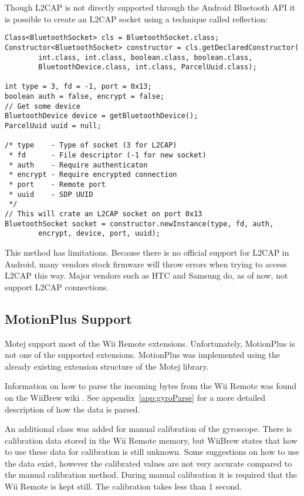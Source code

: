 Though L2CAP is not directly supported through the Android Bluetooth API it is possible to create an L2CAP socket using a technique called reflection:
\begin{lstlisting}
Class<BluetoothSocket> cls = BluetoothSocket.class;
Constructor<BluetoothSocket> constructor = cls.getDeclaredConstructor(
		int.class, int.class, boolean.class, boolean.class,
		BluetoothDevice.class, int.class, ParcelUuid.class);

int type = 3, fd = -1, port = 0x13;
boolean auth = false, encrypt = false;
// Get some device
BluetoothDevice device = getBluetoothDevice();
ParcelUuid uuid = null;

/* type    - Type of socket (3 for L2CAP)
 * fd      - File descriptor (-1 for new socket)
 * auth    - Require authenticaton
 * encrypt - Require encrypted connection
 * port    - Remote port
 * uuid	   - SDP UUID
 */
// This will crate an L2CAP socket on port 0x13
BluetoothSocket socket = constructor.newInstance(type, fd, auth,
		encrypt, device, port, uuid);
\end{lstlisting}

This method has limitations. Because there is no official support for L2CAP in Android, many vendors stock firmware will throw errors when trying to access L2CAP this way. Major vendors such as HTC and Samsung do, as of now, not support L2CAP connections.

\subsection{MotionPlus Support}
Motej support most of the Wii Remote extensions. Unfortunately, MotionPlus is not one of the supported extensions. MotionPlus was implemented using the already existing extension structure of the Motej library.

Information on how to parse the incoming bytes from the Wii Remote was found on the WiiBrew wiki \cite{wiiBrew}. See appendix~\ref{app:gyroParse} for a more detailed description of how the data is parsed. 

An additional class was added for manual calibration of the gyroscope. There is calibration data stored in the Wii Remote memory, but WiiBrew states that how to use these data for calibration is still unknown. Some suggestions on how to use the data exist, however the calibrated values are not very accurate compared to the manual calibration method. During manual calibration it is required that the Wii Remote is kept still. The calibration takes less than 1 second.

